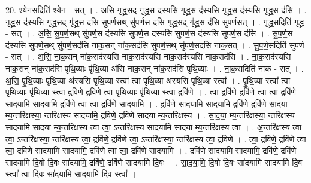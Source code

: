 \documentclass[17pt]{extarticle}
\begin{document}
20. श्ये॒न॒सदिति॑ श्येन - सत् । . अ॒सि॒ गृ॒द्ध्र॒सद् गृ॑द्ध्र॒स द॑स्यसि गृद्ध्र॒स द॑स्यसि गृद्ध्र॒स द॑स्यसि गृद्ध्र॒स द॑सि । . गृ॒द्ध्र॒स द॑स्यसि गृद्ध्र॒सद् गृ॑द्ध्र॒स द॑सि सुपर्ण॒सथ् सु॑पर्ण॒स द॑सि गृद्ध्र॒सद् 
गृ॑द्ध्र॒स द॑सि सुपर्ण॒सत् । . गृ॒द्ध्र॒सदिति॑ गृद्ध्र - सत् । . अ॒सि॒ सु॒प॒र्ण॒सथ् सु॑पर्ण॒स द॑स्यसि सुपर्ण॒स द॑स्यसि सुपर्ण॒स द॑स्यसि सुपर्ण॒स द॑सि । . सु॒प॒र्ण॒स द॑स्यसि सुपर्ण॒सथ् सु॑पर्ण॒सद॑सि नाक॒सन् ना॑क॒सद॑सि सुपर्ण॒सथ् सु॑पर्ण॒सद॑सि नाक॒सत् । . सु॒प॒र्ण॒सदिति॑ सुपर्ण - सत् । . अ॒सि॒ ना॒क॒सन् ना॑क॒सद॑स्यसि नाक॒सद॑स्यसि नाक॒सद॑स्यसि नाक॒सद॑सि । . ना॒क॒सद॑स्यसि नाक॒सन् ना॑क॒सद॑सि पृथि॒व्याः पृ॑थि॒व्या अ॑सि नाक॒सन् ना॑क॒सद॑सि पृथि॒व्याः । . ना॒क॒सदिति॑ नाक - सत् । . अ॒सि॒ पृ॒थि॒व्याः पृ॑थि॒व्या अ॑स्यसि पृथि॒व्या स्त्वा᳚ त्वा पृथि॒व्या अ॑स्यसि पृथि॒व्या स्त्वा᳚ । . पृ॒थि॒व्या स्त्वा᳚ त्वा पृथि॒व्याः पृ॑थि॒व्या स्त्वा॒ द्रवि॑णे॒ द्रवि॑णे त्वा पृथि॒व्याः पृ॑थि॒व्या स्त्वा॒ द्रवि॑णे । . त्वा॒ द्रवि॑णे॒ द्रवि॑णे त्वा त्वा॒ द्रवि॑णे सादयामि सादयामि॒ द्रवि॑णे त्वा त्वा॒ द्रवि॑णे सादयामि । . द्रवि॑णे सादयामि सादयामि॒ द्रवि॑णे॒ द्रवि॑णे सादया म्य॒न्तरि॑क्षस्या॒ न्तरि॑क्षस्य सादयामि॒ द्रवि॑णे॒ द्रवि॑णे सादया म्य॒न्तरि॑क्षस्य । . सा॒द॒या॒ म्य॒न्तरि॑क्षस्या॒ न्तरि॑क्षस्य सादयामि सादया म्य॒न्तरि॑क्षस्य त्वा त्वा॒ ऽन्तरि॑क्षस्य सादयामि सादया म्य॒न्तरि॑क्षस्य त्वा । . अ॒न्तरि॑क्षस्य त्वा त्वा॒ ऽन्तरि॑क्षस्या॒ न्तरि॑क्षस्य त्वा॒ द्रवि॑णे॒ द्रवि॑णे त्वा॒ ऽन्तरि॑क्षस्या॒ न्तरि॑क्षस्य त्वा॒ द्रवि॑णे । . त्वा॒ द्रवि॑णे॒ द्रवि॑णे त्वा त्वा॒ द्रवि॑णे सादयामि सादयामि॒ द्रवि॑णे त्वा त्वा॒ द्रवि॑णे सादयामि । . द्रवि॑णे सादयामि सादयामि॒ द्रवि॑णे॒ द्रवि॑णे सादयामि दि॒वो दि॒वः सा॑दयामि॒ द्रवि॑णे॒ द्रवि॑णे सादयामि दि॒वः । . सा॒द॒या॒मि॒ दि॒वो दि॒वः सा॑दयामि सादयामि दि॒व स्त्वा᳚ त्वा दि॒वः सा॑दयामि सादयामि दि॒व स्त्वा᳚ । \newline
\end{document}

